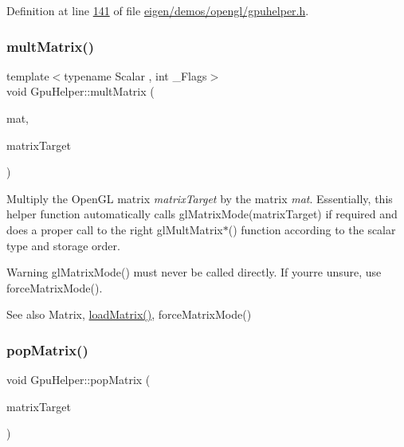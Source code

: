 Definition at line \hyperlink{eigen_2demos_2opengl_2gpuhelper_8h_source_l00141}{141} of file \hyperlink{eigen_2demos_2opengl_2gpuhelper_8h_source}{eigen/demos/opengl/gpuhelper.\+h}.

\mbox{\label{class_gpu_helper_a3abb45392e7dcf6450fa94bd345d9096}} 
\subsubsection{\texorpdfstring{mult\+Matrix()}{multMatrix()}\hspace{0.1cm}{\footnotesize\ttfamily [2/2]}}
{\footnotesize\ttfamily template$<$typename Scalar , int \+\_\+\+Flags$>$ \\
void Gpu\+Helper\+::mult\+Matrix (\begin{DoxyParamCaption}\item[{const \hyperlink{group___core___module_class_eigen_1_1_matrix}{Matrix}$<$ Scalar, 4, 4, \+\_\+\+Flags, 4, 4 $>$ \&}]{mat,  }\item[{G\+Lenum}]{matrix\+Target }\end{DoxyParamCaption})}

Multiply the Open\+GL matrix {\itshape matrix\+Target} by the matrix {\itshape mat}. Essentially, this helper function automatically calls gl\+Matrix\+Mode(matrix\+Target) if required and does a proper call to the right gl\+Mult\+Matrix$\ast$() function according to the scalar type and storage order. \begin{DoxyWarning}{Warning}
gl\+Matrix\+Mode() must never be called directly. If your\textquotesingle{}re unsure, use force\+Matrix\+Mode(). 
\end{DoxyWarning}
\begin{DoxySeeAlso}{See also}
Matrix, \hyperlink{class_gpu_helper_a31ac77373dc54409648558d79d5a8c3e}{load\+Matrix()}, force\+Matrix\+Mode() 
\end{DoxySeeAlso}
\mbox{\label{class_gpu_helper_aad0cc23c2eaf0dcc610b180e5c8b195e}} 
\subsubsection{\texorpdfstring{pop\+Matrix()}{popMatrix()}\hspace{0.1cm}{\footnotesize\ttfamily [1/2]}}
{\footnotesize\ttfamily void Gpu\+Helper\+::pop\+Matrix (\begin{DoxyParamCaption}\item[{G\+Lenum}]{matrix\+Target }\end{DoxyParamCaption})\hspace{0.3cm}{\ttfamily [inline]}}

